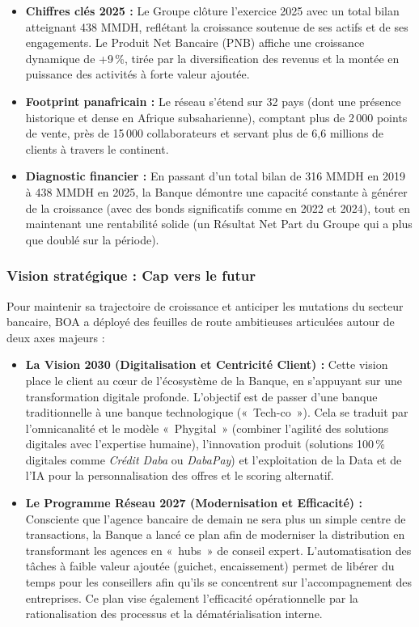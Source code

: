 \begin{itemize}
  \item \textbf{Chiffres clés 2025 :} Le Groupe clôture l'exercice 2025 avec un total bilan atteignant 438 MMDH, reflétant la croissance soutenue de ses actifs et de ses engagements. Le Produit Net Bancaire (PNB) affiche une croissance dynamique de +9\,\%, tirée par la diversification des revenus et la montée en puissance des activités à forte valeur ajoutée.

  \item \textbf{Footprint panafricain :} Le réseau s'étend sur 32 pays (dont une présence historique et dense en Afrique subsaharienne), comptant plus de 2\,000 points de vente, près de 15\,000 collaborateurs et servant plus de 6,6 millions de clients à travers le continent.

  \item \textbf{Diagnostic financier :} En passant d'un total bilan de 316 MMDH en 2019 à 438 MMDH en 2025, la Banque démontre une capacité constante à générer de la croissance (avec des bonds significatifs comme en 2022 et 2024), tout en maintenant une rentabilité solide (un Résultat Net Part du Groupe qui a plus que doublé sur la période).
\end{itemize}

\subsubsection*{Vision stratégique : Cap vers le futur}

Pour maintenir sa trajectoire de croissance et anticiper les mutations du secteur bancaire, BOA a déployé des feuilles de route ambitieuses articulées autour de deux axes majeurs :

\begin{itemize}
  \item \textbf{La Vision 2030 (Digitalisation et Centricité Client) :} Cette vision place le client au c\oe{}ur de l'écosystème de la Banque, en s'appuyant sur une transformation digitale profonde. L'objectif est de passer d'une banque traditionnelle à une banque technologique («~Tech-co~»). Cela se traduit par l'omnicanalité et le modèle «~Phygital~» (combiner l'agilité des solutions digitales avec l'expertise humaine), l'innovation produit (solutions 100\,\% digitales comme \textit{Crédit Daba} ou \textit{DabaPay}) et l'exploitation de la Data et de l'IA pour la personnalisation des offres et le scoring alternatif.

  \item \textbf{Le Programme Réseau 2027 (Modernisation et Efficacité) :} Consciente que l'agence bancaire de demain ne sera plus un simple centre de transactions, la Banque a lancé ce plan afin de moderniser la distribution en transformant les agences en «~hubs~» de conseil expert. L'automatisation des tâches à faible valeur ajoutée (guichet, encaissement) permet de libérer du temps pour les conseillers afin qu'ils se concentrent sur l'accompagnement des entreprises. Ce plan vise également l'efficacité opérationnelle par la rationalisation des processus et la dématérialisation interne.
\end{itemize}

